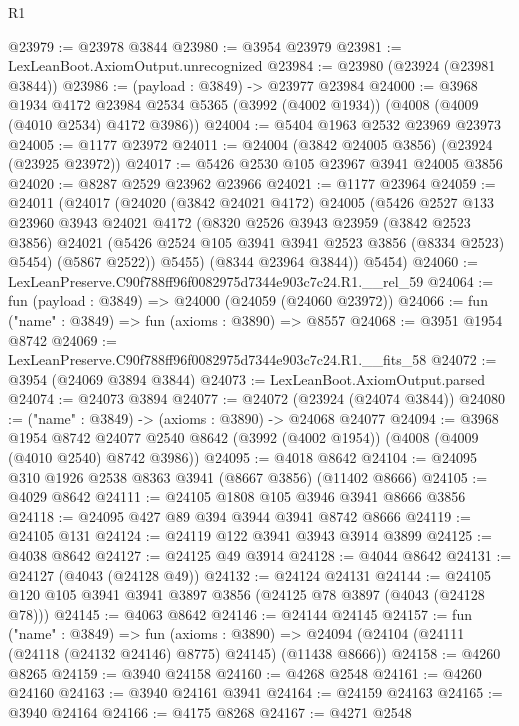 \begin{lexlean}{R1}
\begin{coremodule}
@23979 := @23978 @3844
@23980 := @3954 @23979
@23981 := LexLeanBoot.AxiomOutput.unrecognized
@23984 := @23980 (@23924 (@23981 @3844))
@23986 := (payload : @3849) -> @23977 @23984
@24000 := @3968
    @1934
    @4172
    @23984
    @2534
    @5365
    (@3992 (@4002 @1934))
    (@4008 (@4009 (@4010 @2534) @4172 @3986))
@24004 := @5404 @1963 @2532 @23969 @23973
@24005 := @1177 @23972
@24011 := @24004 (@3842 @24005 @3856) (@23924 (@23925 @23972))
@24017 := @5426 @2530 @105 @23967 @3941 @24005 @3856
@24020 := @8287 @2529 @23962 @23966
@24021 := @1177 @23964
@24059 := @24011
    (@24017
      (@24020
        (@3842 @24021 @4172)
        @24005
        (@5426
          @2527
          @133
          @23960
          @3943
          @24021
          @4172
          (@8320
            @2526
            @3943
            @23959
            (@3842 @2523 @3856)
            @24021
            (@5426 @2524 @105 @3941 @3941 @2523 @3856 (@8334 @2523) @5454)
            (@5867 @2522))
          @5455)
        (@8344 @23964 @3844))
      @5454)
@24060 := LexLeanPreserve.C90f788ff96f0082975d7344e903c7c24.R1.__rel_59
@24064 := fun (payload : @3849) => @24000 (@24059 (@24060 @23972))
@24066 := fun ("name" : @3849) => fun (axioms : @3890) => @8557
@24068 := @3951 @1954 @8742
@24069 := LexLeanPreserve.C90f788ff96f0082975d7344e903c7c24.R1.__fits_58
@24072 := @3954 (@24069 @3894 @3844)
@24073 := LexLeanBoot.AxiomOutput.parsed
@24074 := @24073 @3894
@24077 := @24072 (@23924 (@24074 @3844))
@24080 := ("name" : @3849) -> (axioms : @3890) -> @24068 @24077
@24094 := @3968
    @1954
    @8742
    @24077
    @2540
    @8642
    (@3992 (@4002 @1954))
    (@4008 (@4009 (@4010 @2540) @8742 @3986))
@24095 := @4018 @8642
@24104 := @24095 @310 @1926 @2538 @8363 @3941 (@8667 @3856) (@11402 @8666)
@24105 := @4029 @8642
@24111 := @24105 @1808 @105 @3946 @3941 @8666 @3856
@24118 := @24095 @427 @89 @394 @3944 @3941 @8742 @8666
@24119 := @24105 @131
@24124 := @24119 @122 @3941 @3943 @3914 @3899
@24125 := @4038 @8642
@24127 := @24125 @49 @3914
@24128 := @4044 @8642
@24131 := @24127 (@4043 (@24128 @49))
@24132 := @24124 @24131
@24144 := @24105 @120 @105 @3941 @3941 @3897 @3856 (@24125 @78 @3897 (@4043 (@24128 @78)))
@24145 := @4063 @8642
@24146 := @24144 @24145
@24157 := fun ("name" : @3849) =>
  fun (axioms : @3890) =>
  @24094 (@24104 (@24111 (@24118 (@24132 @24146) @8775) @24145) (@11438 @8666))
@24158 := @4260 @8265
@24159 := @3940 @24158
@24160 := @4268 @2548
@24161 := @4260 @24160
@24163 := @3940 @24161 @3941
@24164 := @24159 @24163
@24165 := @3940 @24164
@24166 := @4175 @8268
@24167 := @4271 @2548

\end{coremodule}
\end{lexlean}
